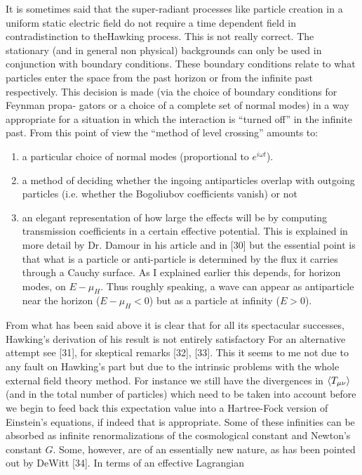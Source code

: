 It is sometimes said that the super-radiant processes like particle creation
in a uniform static electric field do not require a time dependent field in
contradistinction to theHawking process. This is not really correct. The stationary
(and in general non physical) backgrounds can only be used in conjunction
with boundary conditions. These boundary conditions relate to what particles
enter the space from the past horizon or from the infinite past respectively.
This decision is made (via the choice of boundary conditions for Feynman propa-
gators or a choice of a complete set of normal modes) in a way appropriate for a
situation in which the interaction is ``turned off'' in the infinite past. From
this point of view the ``method of level crossing'' amounts to:
\begin{enumerate}
\item a particular choice of normal modes (proportional to $e^{i \omega t}$).
\item a method of deciding whether the ingoing antiparticles overlap with
outgoing particles (i.e. whether the Bogoliubov coefficients vanish)
or not
\item an elegant representation of how large the effects will be by computing 
transmission coefficients in a certain effective potential. This
is explained in more detail by Dr. Damour in his article and in [30]
but the essential point is that what is a particle or anti-particle
is determined by the flux it carries through a Cauchy surface.
As I explained earlier this depends, for horizon modes, on $E-\mu_H$.
Thus roughly speaking, a wave can appear as antiparticle near the horizon
($E-\mu_H < 0$) but as a particle at infinity ($E > 0$).
\end{enumerate}
From what has been said above it is clear that for all its spectacular
successes, Hawking's derivation of his result is not entirely satisfactory For
an alternative attempt see [31], for skeptical remarks [32], [33].
This it seems to me not due to any fault on Hawking's part but due to the intrinsic problems
with the whole external field theory method. For instance we still have
the divergences in $\langle T_{\mu\nu} \rangle$ (and in the total number of particles) which need to be
taken into account before we begin to feed back this expectation value into a
Hartree-Fock version of Einstein's equations, if indeed that is appropriate. Some
of these infinities can be absorbed as infinite renormalizations of the cosmological
constant and Newton's constant $G$. Some, however, are of an essentially new nature, 
as has been pointed out by DeWitt [34]. In terms of an effective Lagrangian 
